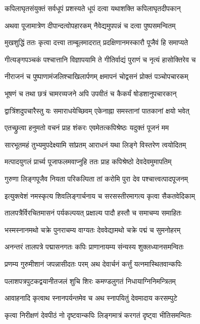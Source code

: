\twolineshloka
{कपिलाघृतसंयुक्तं सर्वधूपं प्रशस्यते}
{धूपं दत्वा यथाशक्ति कपिलाघृतदीपकान्}%

\twolineshloka
{अथवा पूजामात्रेण दीपान्दत्वोपहारकम्}
{नैवेद्यमुपपन्नं च दत्वा पुष्पसमन्वितम्}%

\twolineshloka
{मुखशुद्धिं ततः कृत्वा दत्त्वा ताम्बूलमादरात्}
{प्रदक्षिणानमस्कारौ पूजैवं हि समाप्यते}%

\twolineshloka
{गीत्यङ्गपञ्चकं पश्चात्तानि विज्ञापयामि ते}
{गीतिर्वाद्यं पुराणं च नृत्यं हासोक्तिरेव च}%

\twolineshloka
{नीराजनं च पुष्पाणामंजलिश्चाखिलार्पणम्}
{क्षमापनं चोद्वसनं प्रोक्तं पञ्चोपचारकम्}%

\twolineshloka
{भूषणं च तथा छत्रं चामरव्यजने अपि}
{उपवीतं च कैकर्यं षोडशानुपचारकान्}%

\twolineshloka
{द्वात्रिंशदुपचारैस्तु यः समाराधयेच्छिवम्}
{एकेनाह्ना समस्तानां पातकानां क्षयो भवेत्}%

\twolineshloka
{एतच्छ्रुत्वा हनुमतो वचनं प्राह शंकरः}
{एवमेतत्कपिश्रेष्ठः यदुक्तं पूजनं मम}%

\twolineshloka
{सारभूतमहं तुभ्यमुपदेक्ष्यामि सांप्रतम्}
{आराधनं यथा लिङ्गे विस्तरेण त्वयोदितम्}%

\twolineshloka
{मत्पादयुगलं प्रार्च्य पूजाफलमवाप्नुहि}
{ततः प्राह कपिश्रेष्ठो देवदेवमुमापतिम्}%

\twolineshloka
{गुरुणा लिङ्गपूजैव नियता परिकल्पिता}
{तां करोमि पुरा देव पश्चात्त्वत्पादपूजनम्}%

\twolineshloka
{इत्युक्त्वेशं नमस्कृत्य शिवलिङ्गार्चनाय च}
{सरसस्तीरमागत्य कृत्वा सैकतवेदिकाम्}%

\twolineshloka
{तालपत्रैर्विरचितमासनं पर्यकल्पयत्}
{प्रक्षाल्य पादौ हस्तौ च समाचम्य समाहितः}%

\twolineshloka
{भस्मस्नानमथो चक्रे पुनराचम्य वाग्यतः}
{देववेद्यामथो चक्रे पद्मं च सुमनोहरम्}%

\twolineshloka
{अनन्तरं तालपत्रे पद्मासनगतः कपिः}
{प्राणानायम्य संन्यस्य शुक्लध्यानसमन्वितः}%

\twolineshloka
{प्रणम्य गुरुमीशानं जपन्नासीदतः परम्}
{अथ देवार्चनं कर्त्तुं यत्नमास्थितवान्कपिः}%

\twolineshloka
{पलाशपत्रपुटकद्वयानीतजलं शुचि}
{शिरः कमण्डलुगतं निधायाग्निनिमन्त्रितम्}%

\twolineshloka
{आवाहनादि कृत्वाथ स्नानपर्यन्तमेव च}
{अथ स्नापयितुं देवमादाय करसम्पुटे}%

\twolineshloka
{कृत्वा निरीक्षणं देवपीठं नो दृष्टवान्कपिः}
{लिङ्गमात्रं करगतं दृष्ट्वा भीतिसमन्वितः}%

